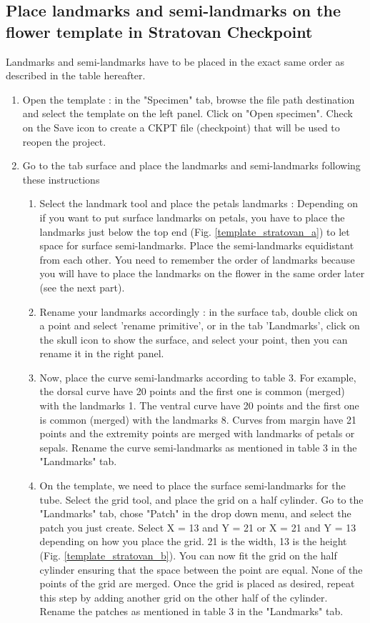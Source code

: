 \documentclass[10pt,letter,english]{article}
\begin{document}
\subsection{Place landmarks and semi-landmarks on the flower template in Stratovan Checkpoint}
Landmarks and semi-landmarks have to be placed in the exact same order as described in the table hereafter.
\begin{enumerate}
    \item  Open the template : in the "Specimen" tab, browse the file path destination and select the template on the left panel. Click on "Open specimen". Check on the Save icon to create a CKPT file (checkpoint) that will be used to reopen the project.
    \item Go to the tab surface and place the landmarks and semi-landmarks following these instructions
    \begin{enumerate}
        \item Select the landmark tool and place the petals landmarks : Depending on if you want to put surface landmarks on petals, you have to place the landmarks just below the top end (Fig. \ref{template_stratovan_a}) to let space for surface semi-landmarks. Place the semi-landmarks equidistant from each other. You need to remember the order of landmarks because you will have to place the landmarks on the flower in the same order later (see the next part). 
        \item  Rename your landmarks accordingly : in the surface tab, double click on a point and select 'rename primitive', or in the tab 'Landmarks', click on the skull icon to show the surface, and select your point, then you can rename it in the right panel.
        \item Now, place the curve semi-landmarks according to table 3. For example, the dorsal curve have 20 points and the first one is common (merged) with the landmarks 1. The ventral curve have 20 points and the first one is common (merged) with the landmarks 8. Curves from margin have 21 points and the extremity points are merged with landmarks of petals or sepals. Rename the curve semi-landmarks as mentioned in table 3 in the "Landmarks" tab. 
        \item On the template, we need to place the surface semi-landmarks for the tube. Select the grid tool, and place the grid on a half cylinder. Go to the "Landmarks" tab, chose "Patch" in the drop down menu, and select the patch you just create. Select X = 13 and Y = 21 or X = 21 and Y = 13 depending on how you place the grid. 21 is the width, 13 is the height (Fig. \ref{template_stratovan_b}). You can now fit the grid on the half cylinder ensuring that the space between the point are equal. None of the points of the grid are merged. Once the grid is placed as desired, repeat this step by adding another grid on the other half of the cylinder. Rename the patches as mentioned in table 3 in the "Landmarks" tab.

\end{enumerate}
\end{enumerate}
\end{document}
